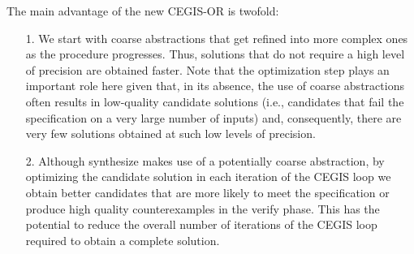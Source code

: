 \documentclass[a4paper,UKenglish]{lipics-v2018}
\begin{document}
The main advantage of the new CEGIS-OR is twofold:
\begin{itemize}
\item[1.] We start with coarse abstractions that get refined into more
  complex ones as the procedure progresses. Thus, solutions that do
  not require a high level of precision are obtained faster.  Note
  that the optimization step plays an important role here given that,
  in its absence, the use of coarse abstractions often results in
  low-quality candidate solutions (i.e., candidates that fail the
  specification on a very large number of inputs) and, consequently,
  there are very few solutions obtained at such low levels of
  precision.
\item[2.] Although {\sc synthesize} makes use of a potentially coarse abstraction,
  by optimizing the candidate solution in each iteration of the CEGIS loop
  we obtain better candidates that are more likely to meet the
  specification or produce high quality counterexamples in the
  {\sc verify} phase.
  This has the potential to reduce
  the overall number of iterations of the CEGIS loop required to obtain a complete solution.
\end{itemize}
  


\end{document}
